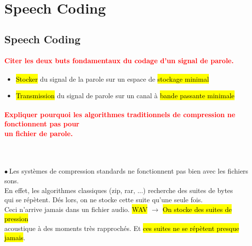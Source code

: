 \documentclass[letterpaper, 12pt]{article}
\newcommand{\alinea}{
\hspace*{0.3cm}}
\newcommand{\red}[1]{
	\textcolor{red}{#1}
}
\newcommand{\point}{$\bullet\ $}
\begin{document}
\section{Speech Coding}
	\subsection{Speech Coding}
		\paragraph{\red{Citer les deux buts fondamentaux du codage d'un signal de parole.}}
			\begin{itemize}	
				\item \hl{Stocker} du signal de la parole sur un espace de \hl{stockage minimal}
				\item \hl{Transmission} du signal de parole sur un canal à \hl{bande passante minimale}
			\end{itemize}
		
		\paragraph{\red{Expliquer pourquoi les algorithmes traditionnels de compression ne fonctionnent pas pour  
		~\\ \hspace*{0.035cm} un fichier de parole.}}~\\~\\
			\point Les systèmes de compression standards ne fonctionnent pas bien avec les fichiers sons.
				\\\alinea En effet, les algorithmes classiques (zip, rar, ...) recherche des suites de bytes
				\\\alinea qui se répètent. Dés lors, on ne stocke cette suite qu'une seule fois.
				\\\alinea Ceci n'arrive jamais dans un fichier audio. \hl{WAV} $\rightarrow$ \hl{On stocke des suites 
				de pression}
				\\\alinea acoustique à des moments très rapprochés. Et \hl{ces suites ne se r\'ep\`etent 
				presque jamais}.
		
\end{document}
